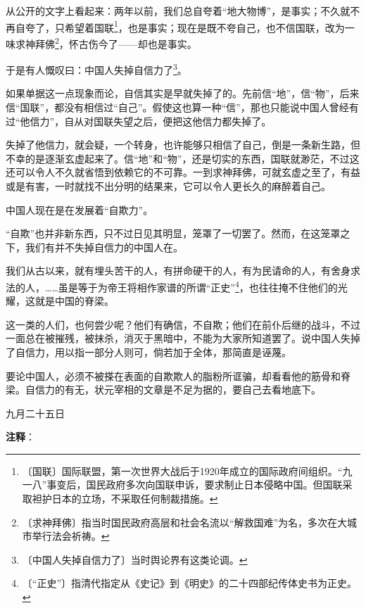 \documentclass[12pt,UTF-8,openany]{ctexbook}
\begin{document}
\begin{large}
    
    从公开的文字上看起来：两年以前，我们总自夸着“地大物博”，是事实；不久就不再自夸了，只希望着国联\footnote{〔国联〕国际联盟，第一次世界大战后于1920年成立的国际政府间组织。“九一八”事变后，国民政府多次向国联申诉，要求制止日本侵略中国。但国联采取袒护日本的立场，不采取任何制裁措施。}，也是事实；现在是既不夸自己，也不信国联，改为一味求神拜佛\footnote{〔求神拜佛〕指当时国民政府高层和社会名流以“解救国难”为名，多次在大城市举行法会祈祷。}，怀古伤今了——却也是事实。
    
    于是有人慨叹曰：中国人失掉自信力了\footnote{〔中国人失掉自信力了〕当时舆论界有这类论调。}。
    
    如果单据这一点现象而论，自信其实是早就失掉了的。先前信“地”，信“物”，后来信“国联”，都没有相信过“自己”。假使这也算一种“信”，那也只能说中国人曾经有过“他信力”，自从对国联失望之后，便把这他信力都失掉了。
    
    失掉了他信力，就会疑，一个转身，也许能够只相信了自己，倒是一条新生路，但不幸的是逐渐玄虚起来了。信“地”和“物”，还是切实的东西，国联就渺茫，不过这还可以令人不久就省悟到依赖它的不可靠。一到求神拜佛，可就玄虚之至了，有益或是有害，一时就找不出分明的结果来，它可以令人更长久的麻醉着自己。
    
    中国人现在是在发展着“自欺力”。
    
    “自欺”也并非新东西，只不过日见其明显，笼罩了一切罢了。然而，在这笼罩之下，我们有并不失掉自信力的中国人在。
    
    我们从古以来，就有埋头苦干的人，有拼命硬干的人，有为民请命的人，有舍身求法的人，……虽是等于为帝王将相作家谱的所谓“正史”\footnote{〔“正史”〕指清代指定从《史记》到《明史》的二十四部纪传体史书为正史。}，也往往掩不住他们的光耀，这就是中国的脊梁。
    
    这一类的人们，也何尝少呢？他们有确信，不自欺；他们在前仆后继的战斗，不过一面总在被摧残，被抹杀，消灭于黑暗中，不能为大家所知道罢了。说中国人失掉了自信力，用以指一部分人则可，倘若加于全体，那简直是诬蔑。
    
    要论中国人，必须不被搽在表面的自欺欺人的脂粉所诓骗，却看看他的筋骨和脊梁。自信力的有无，状元宰相的文章是不足为据的，要自己去看地底下。
    
    \hfill 九月二十五日
    
\end{large}


\newpage

\textbf{注释}：

\vspace{-1em}
\end{document}
